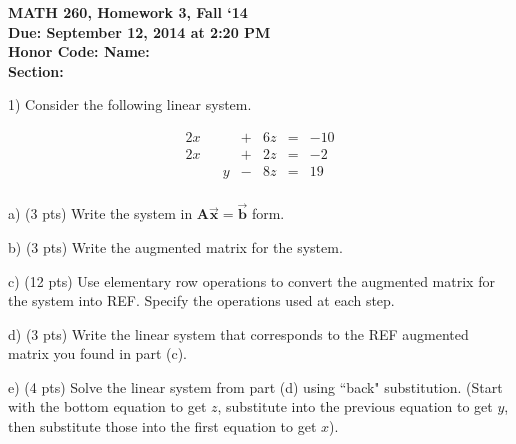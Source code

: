 \documentclass{article}
\begin{document}
\begin{flushleft}
	\bfseries{MATH 260, Homework 3, Fall `14}\\
	\bfseries{Due: September 12, 2014 at 2:20 PM}\\
	\bfseries{Honor Code:} \hspace{3.5in}\bfseries{Name:}\\
	\hspace{4.37in}\bfseries{Section:}
\end{flushleft}
\begin{flushleft}
\vspace{.25in}

1) Consider the following linear system.

\begin{equation*}
\begin{array}{ccccccr}
2x &   &    & + & 6z & = & -10\\
2x &   &    & + & 2z & = & -2\\
   &   &  y & - & 8z & = & 19\\

\end{array}
\end{equation*}

a) (3 pts) Write the system in $\textbf{A}\vec{\textbf{x}} = \vec{\textbf{b}}$ form.

\vspace{1in}

b) (3 pts) Write the augmented matrix for the system.

\vspace{1in}

c) (12 pts) Use elementary row operations to convert the augmented matrix for the system into REF.  Specify the operations used at each step.

\pagebreak

d) (3 pts) Write the linear system that corresponds to the REF augmented matrix you found in part (c).

\vspace{1.5in}

e) (4 pts) Solve the linear system from part (d) using ``back" substitution.  (Start with the bottom equation to get $z$, substitute into the previous equation to get $y$, then substitute those into the first equation to get $x$).

\end{flushleft}
\end{document}
